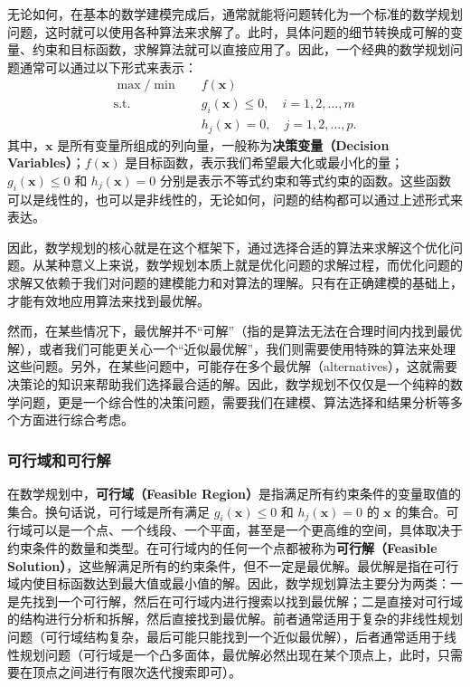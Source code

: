 \documentclass[12pt]{article}
\theoremstyle{plain}
\theoremstyle{definition}
\newcommand{\st}{\mathrel{\text{s.t.}}}
\begin{document}
无论如何，在基本的数学建模完成后，通常就能将问题转化为一个标准的数学规划问题，这时就可以使用各种算法来求解了。此时，具体问题的细节转换成可解的变量、约束和目标函数，求解算法就可以直接应用了。因此，一个经典的数学规划问题通常可以通过以下形式来表示：
\begin{align*}
    \max/\min \quad & f(\bm{x}) \\
    \st \quad & g_i(\bm{x}) \leq 0, \quad i = 1, 2, \ldots, m \\
    & h_j(\bm{x}) = 0, \quad j = 1, 2, \ldots, p.
\end{align*}
其中，$\bm{x}$ 是所有变量所组成的列向量，一般称为\textbf{决策变量（Decision Variables）}；$f(\bm{x})$ 是目标函数，表示我们希望最大化或最小化的量；$g_i(\bm{x}) \leq 0$ 和 $h_j(\bm{x}) = 0$ 分别是表示不等式约束和等式约束的函数。这些函数可以是线性的，也可以是非线性的，无论如何，问题的结构都可以通过上述形式来表达。

因此，数学规划的核心就是在这个框架下，通过选择合适的算法来求解这个优化问题。从某种意义上来说，数学规划本质上就是优化问题的求解过程，而优化问题的求解又依赖于我们对问题的建模能力和对算法的理解。只有在正确建模的基础上，才能有效地应用算法来找到最优解。

然而，在某些情况下，最优解并不“可解”（指的是算法无法在合理时间内找到最优解），或者我们可能更关心一个“近似最优解”，我们则需要使用特殊的算法来处理这些问题。另外，在某些问题中，可能存在多个最优解（alternatives），这就需要决策论的知识来帮助我们选择最合适的解。因此，数学规划不仅仅是一个纯粹的数学问题，更是一个综合性的决策问题，需要我们在建模、算法选择和结果分析等多个方面进行综合考虑。

\subsubsection{可行域和可行解}\label{subsubsec:feasible_region}

在数学规划中，\textbf{可行域（Feasible Region）}是指满足所有约束条件的变量取值的集合。换句话说，可行域是所有满足 $g_i(\bm{x}) \leq 0$ 和 $h_j(\bm{x}) = 0$ 的 $\bm{x}$ 的集合。可行域可以是一个点、一个线段、一个平面，甚至是一个更高维的空间，具体取决于约束条件的数量和类型。在可行域内的任何一个点都被称为\textbf{可行解（Feasible Solution）}，这些解满足所有的约束条件，但不一定是最优解。最优解是指在可行域内使目标函数达到最大值或最小值的解。因此，数学规划算法主要分为两类：一是先找到一个可行解，然后在可行域内进行搜索以找到最优解；二是直接对可行域的结构进行分析和拆解，然后直接找到最优解。前者通常适用于复杂的非线性规划问题（可行域结构复杂，最后可能只能找到一个近似最优解），后者通常适用于线性规划问题（可行域是一个凸多面体，最优解必然出现在某个顶点上，此时，只需要在顶点之间进行有限次迭代搜索即可）。
\end{document}
